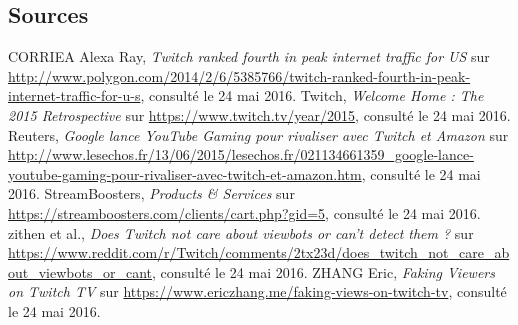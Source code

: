 \documentclass[a4paper]{article}
\begin{document}
\subsection{Sources}
\begin{thebibliography}{10}	
     CORRIEA Alexa Ray, \textit{Twitch ranked fourth in peak internet traffic for US} sur \url{http://www.polygon.com/2014/2/6/5385766/twitch-ranked-fourth-in-peak-internet-traffic-for-u-s}, consulté le 24 mai 2016.
     Twitch, \textit{Welcome Home : The 2015 Retrospective} sur \url{https://www.twitch.tv/year/2015}, consulté le 24 mai 2016.
     Reuters, \textit{Google lance YouTube Gaming pour rivaliser avec Twitch et Amazon} sur \url{http://www.lesechos.fr/13/06/2015/lesechos.fr/021134661359_google-lance-youtube-gaming-pour-rivaliser-avec-twitch-et-amazon.htm}, consulté le 24 mai 2016.
     StreamBoosters, \textit{Products \& Services} sur \url{https://streamboosters.com/clients/cart.php?gid=5}, consulté le 24 mai 2016.
     zithen et al., \textit{Does Twitch not care about viewbots or can't detect them ?} sur \url{https://www.reddit.com/r/Twitch/comments/2tx23d/does_twitch_not_care_about_viewbots_or_cant}, consulté le 24 mai 2016.
     ZHANG Eric, \textit{Faking Viewers on Twitch TV} sur \url{https://www.ericzhang.me/faking-views-on-twitch-tv}, consulté le 24 mai 2016.
\end{thebibliography}
\end{document}
